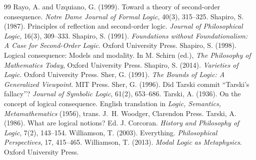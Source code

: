 \documentclass{situationist-preprint}
\begin{document}
\begin{thebibliography}{99}
 Rayo, A. and Uzquiano, G. (1999). Toward a theory of second-order consequence. \emph{Notre Dame Journal of Formal Logic}, 40(3), 315--325.
 Shapiro, S. (1987). Principles of reflection and second-order logic. \emph{Journal of Philosophical Logic}, 16(3), 309--333.
 Shapiro, S. (1991). \emph{Foundations without Foundationalism: A Case for Second-Order Logic}. Oxford University Press.
 Shapiro, S. (1998). Logical consequence: Models and modality. In M. Schirn (ed.), \emph{The Philosophy of Mathematics Today}, Oxford University Press.
 Shapiro, S. (2014). \emph{Varieties of Logic}. Oxford University Press.
 Sher, G. (1991). \emph{The Bounds of Logic: A Generalized Viewpoint}. MIT Press.
 Sher, G. (1996). Did Tarski commit \enquote{Tarski's fallacy}? \emph{Journal of Symbolic Logic}, 61(2), 653--686.
 Tarski, A. (1936). On the concept of logical consequence. English translation in \emph{Logic, Semantics, Metamathematics} (1956), trans. J.~H. Woodger, Clarendon Press.
 Tarski, A. (1986). What are logical notions? Ed. J. Corcoran. \emph{History and Philosophy of Logic}, 7(2), 143--154.
 Williamson, T. (2003). Everything. \emph{Philosophical Perspectives}, 17, 415--465.
 Williamson, T. (2013). \emph{Modal Logic as Metaphysics}. Oxford University Press.
\end{thebibliography}
\end{document}
